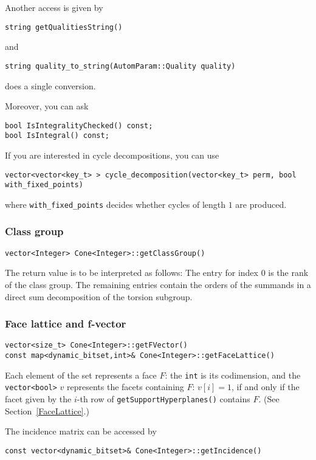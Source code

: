\begin{small}
Another access is given by
\begin{Verbatim}
string getQualitiesString()
\end{Verbatim}
and
\begin{Verbatim}
string quality_to_string(AutomParam::Quality quality)
\end{Verbatim}
does a single conversion.

Moreover, you can ask
\begin{Verbatim}
bool IsIntegralityChecked() const;
bool IsIntegral() const;
\end{Verbatim}

If you are interested in cycle decompositions, you can use
\begin{Verbatim}
vector<vector<key_t> > cycle_decomposition(vector<key_t> perm, bool with_fixed_points)
\end{Verbatim}
where \verb|with_fixed_points| decides whether cycles of length $1$ are produced.

\subsubsection{Class group}

\begin{Verbatim}
vector<Integer> Cone<Integer>::getClassGroup()
\end{Verbatim}
The return value is to be interpreted as follows: The entry for index $0$ is the rank of the class group. The remaining entries contain the orders of the summands in a direct sum decomposition of the torsion subgroup.

\subsubsection{Face lattice and f-vector}
\begin{Verbatim}
vector<size_t> Cone<Integer>::getFVector()
const map<dynamic_bitset,int>& Cone<Integer>::getFaceLattice()
\end{Verbatim}
Each element of the set represents a face $F$: the \verb|int| is its codimension, and the \verb|vector<bool>| $v$ represents the facets containing $F$: $v[i]=1$, if and only if the facet given by the $i$-th row of \verb|getSupportHyperplanes()| contains $F$. (See Section~\ref{FaceLattice}.)

The incidence matrix can be accessed by

\begin{Verbatim}
const vector<dynamic_bitset>& Cone<Integer>::getIncidence()
\end{Verbatim}


\end{small}
